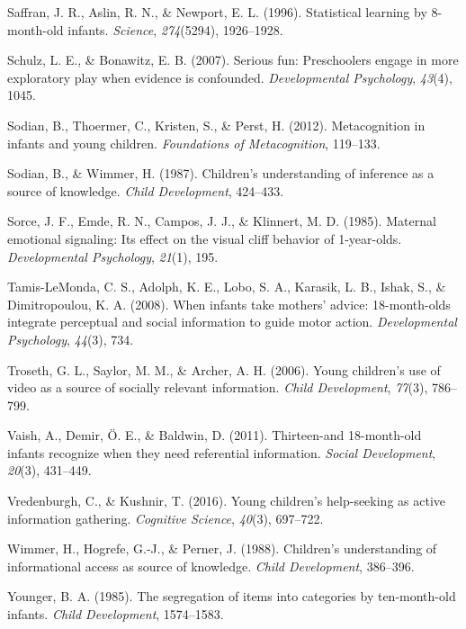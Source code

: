 \documentclass[,man,floatsintext]{apa6}
\begin{document}
\leavevmode\hypertarget{ref-saffran1996statistical}{}%
Saffran, J. R., Aslin, R. N., \& Newport, E. L. (1996). Statistical learning by 8-month-old infants. \emph{Science}, \emph{274}(5294), 1926--1928.

\leavevmode\hypertarget{ref-schulz2007serious}{}%
Schulz, L. E., \& Bonawitz, E. B. (2007). Serious fun: Preschoolers engage in more exploratory play when evidence is confounded. \emph{Developmental Psychology}, \emph{43}(4), 1045.

\leavevmode\hypertarget{ref-sodian2012metacognition}{}%
Sodian, B., Thoermer, C., Kristen, S., \& Perst, H. (2012). Metacognition in infants and young children. \emph{Foundations of Metacognition}, 119--133.

\leavevmode\hypertarget{ref-sodian1987children}{}%
Sodian, B., \& Wimmer, H. (1987). Children's understanding of inference as a source of knowledge. \emph{Child Development}, 424--433.

\leavevmode\hypertarget{ref-sorce1985maternal}{}%
Sorce, J. F., Emde, R. N., Campos, J. J., \& Klinnert, M. D. (1985). Maternal emotional signaling: Its effect on the visual cliff behavior of 1-year-olds. \emph{Developmental Psychology}, \emph{21}(1), 195.

\leavevmode\hypertarget{ref-tamis2008infants}{}%
Tamis-LeMonda, C. S., Adolph, K. E., Lobo, S. A., Karasik, L. B., Ishak, S., \& Dimitropoulou, K. A. (2008). When infants take mothers' advice: 18-month-olds integrate perceptual and social information to guide motor action. \emph{Developmental Psychology}, \emph{44}(3), 734.

\leavevmode\hypertarget{ref-troseth2006young}{}%
Troseth, G. L., Saylor, M. M., \& Archer, A. H. (2006). Young children's use of video as a source of socially relevant information. \emph{Child Development}, \emph{77}(3), 786--799.

\leavevmode\hypertarget{ref-vaish2011thirteen}{}%
Vaish, A., Demir, Ö. E., \& Baldwin, D. (2011). Thirteen-and 18-month-old infants recognize when they need referential information. \emph{Social Development}, \emph{20}(3), 431--449.

\leavevmode\hypertarget{ref-vredenburgh2016young}{}%
Vredenburgh, C., \& Kushnir, T. (2016). Young children's help-seeking as active information gathering. \emph{Cognitive Science}, \emph{40}(3), 697--722.

\leavevmode\hypertarget{ref-wimmer1988children}{}%
Wimmer, H., Hogrefe, G.-J., \& Perner, J. (1988). Children's understanding of informational access as source of knowledge. \emph{Child Development}, 386--396.

\leavevmode\hypertarget{ref-younger1985segregation}{}%
Younger, B. A. (1985). The segregation of items into categories by ten-month-old infants. \emph{Child Development}, 1574--1583.
\end{document}
